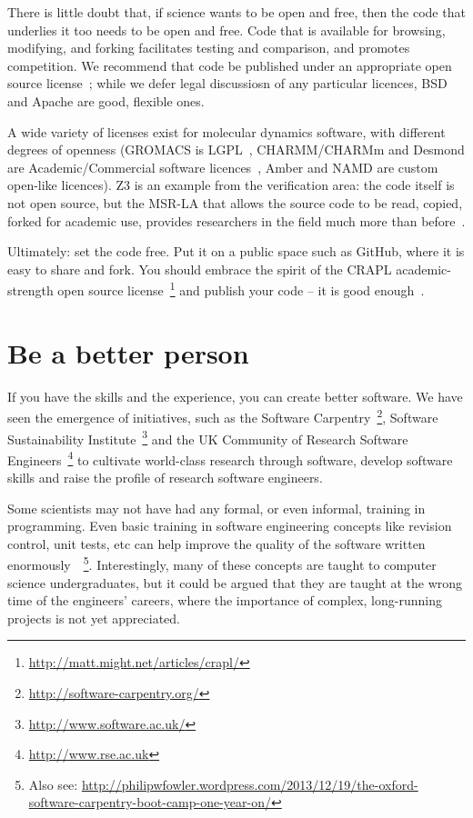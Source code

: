 \documentclass[conference]{IEEEtran}
\begin{document}
There is little doubt that, if science wants to be open and free, then
the code that underlies it too needs to be open and free. Code that is
available for browsing, modifying, and forking facilitates testing and
comparison, and promotes competition. We recommend that code be
published under an appropriate open source license~\cite{osl}; while
we defer legal discussiosn of any particular licences, BSD and Apache
are good, flexible ones.

A wide variety of licenses exist for molecular dynamics software, with
different degrees of openness (GROMACS is LGPL~\cite{Hess2008},
CHARMM/CHARMm and Desmond are Academic/Commercial software
licences~\cite{Brooks2009,Bowers2006}, Amber and NAMD are custom
open-like licences). Z3 is an example from the verification area: the
code itself is not open source, but the MSR-LA that allows the source
code to be read, copied, forked for academic use, provides researchers
in the field much more than before~\cite{deMoura2012Z3open}.

Ultimately: set the code free. Put it on a public space such as GitHub, where it
is easy to share and fork. You should embrace the spirit of the CRAPL
academic-strength open source
license~\footnote{\url{http://matt.might.net/articles/crapl/}} and
publish your code -- it is good enough~\cite{barnes:2010}.


\section{Be a better person}

If you have the skills and the experience, you can create better
software. We have seen the emergence of initiatives, such as the Software
Carpentry~\footnote{\url{http://software-carpentry.org/}}, Software
Sustainability Institute~\footnote{\url{http://www.software.ac.uk/}}
and the UK Community of Research Software
Engineers~\footnote{\url{http://www.rse.ac.uk}} to cultivate
world-class research through software, develop software skills and
raise the profile of research software engineers.

Some scientists may not have had any formal, or even informal,
training in programming. Even basic training in software engineering
concepts like revision control, unit tests, etc can help improve the
quality of the software written
enormously~\cite{Wilson2014}~\footnote{Also see:
\url{http://philipwfowler.wordpress.com/2013/12/19/the-oxford-software-carpentry-boot-camp-one-year-on/}}.
Interestingly, many of these concepts are taught to computer science
undergraduates, but it could be argued that they are taught at the
wrong time of the engineers' careers, where the importance of complex,
long-running projects is not yet appreciated.
\end{document}
